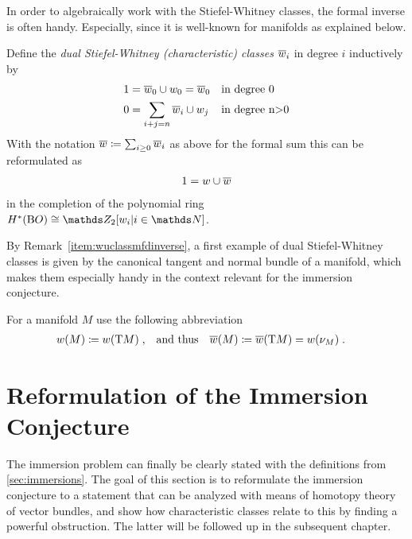 In order to algebraically work with the Stiefel-Whitney classes, the
formal inverse is often handy. Especially, since it is well-known for
manifolds as explained below.
\begin{Def}
  Define the \emph{dual Stiefel-Whitney (characteristic) classes}
  $\overline{w}_{i}$ in degree $i$ inductively by
  \begin{align*}
    1 &= \overline{w}_{0}\cup w_{0} = \overline{w}_{0}    &&\text{in degree 0}\\
    0 &= \sum_{i+j=n} \overline{w}_{i}\cup w_{j}  &&\text{in degree n>0}
  \end{align*}
  With the notation $\overline{w}\coloneqq \sum_{i\geq0} \overline{w}_{i}$ as above
  for the formal sum this can be reformulated as
  \begin{gather*}
    1 = w\cup\overline{w}
  \end{gather*}
  in the completion of the polynomial ring $\H^*(\BO)\cong\Zmod2[\ws{i}|i\in\Nat]$.
\end{Def}
By
Remark~\ref{item:wuclassmfdinverse},
a first example of dual Stiefel-Whitney classes is given by the
canonical tangent and normal bundle of a manifold, which makes them
especially handy in the context relevant for the immersion conjecture.
\begin{Def}
  For a manifold $M$ use the following abbreviation
  \begin{align*}
    {w}(M) &\coloneqq {w}(\mathrm{T}M)
            \;,
    &\text{and thus}&
    &{\overline{w}}(M) &\coloneqq {\overline{w}}(\mathrm{T}M) = {w}(\nu_{M})
    \;.
  \end{align*}
\end{Def}

\section{Reformulation of the Immersion Conjecture}
\label{sec:reformulation}

The immersion problem can finally be clearly stated with the
definitions from \autoref{sec:immersions}.
The goal of this section is to reformulate the immersion conjecture to
a statement that can be analyzed with means of homotopy theory of
vector bundles, and show how characteristic classes relate to this by
finding a powerful obstruction.
The latter will be followed up in the subsequent chapter.

